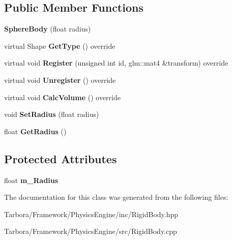 \subsection*{Public Member Functions}
\begin{DoxyCompactItemize}
\item 
\mbox{\label{classTarbora_1_1SphereBody_a35e582dfbc4660cb796360ceec62e168}} 
{\bfseries Sphere\+Body} (float radius)
\item 
\mbox{\label{classTarbora_1_1SphereBody_ac8f3bbe52785cd7ede9669b87e5c54f1}} 
virtual Shape {\bfseries Get\+Type} () override
\item 
\mbox{\label{classTarbora_1_1SphereBody_aa4c177c62075afa568b73ec019201dd7}} 
virtual void {\bfseries Register} (unsigned int id, glm\+::mat4 \&transform) override
\item 
\mbox{\label{classTarbora_1_1SphereBody_abb1c800fda3cfab36f60a64fb8c77cae}} 
virtual void {\bfseries Unregister} () override
\item 
\mbox{\label{classTarbora_1_1SphereBody_a6421e1677d335d10f3f49c68f71613ab}} 
virtual void {\bfseries Calc\+Volume} () override
\item 
\mbox{\label{classTarbora_1_1SphereBody_a218bff80687143aff24f524cc01f2175}} 
void {\bfseries Set\+Radius} (float radius)
\item 
\mbox{\label{classTarbora_1_1SphereBody_a5554aa58df71f4ada4537d48b5e0b1d3}} 
float {\bfseries Get\+Radius} ()
\end{DoxyCompactItemize}
\subsection*{Protected Attributes}
\begin{DoxyCompactItemize}
\item 
\mbox{\label{classTarbora_1_1SphereBody_aeaeaae8f36512f942219e87db73eb2ac}} 
float {\bfseries m\+\_\+\+Radius}
\end{DoxyCompactItemize}


The documentation for this class was generated from the following files\+:\begin{DoxyCompactItemize}
\item 
Tarbora/\+Framework/\+Physics\+Engine/inc/Rigid\+Body.\+hpp\item 
Tarbora/\+Framework/\+Physics\+Engine/src/Rigid\+Body.\+cpp\end{DoxyCompactItemize}

